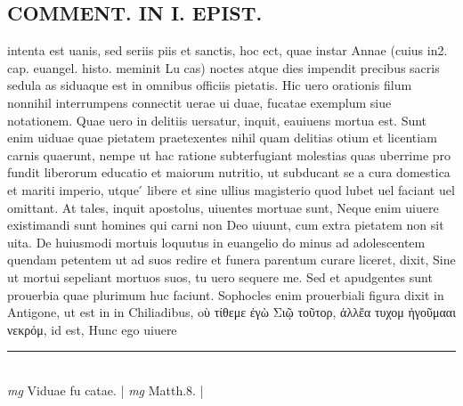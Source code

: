 \documentclass{article}
\begin{document}
\begin{pages}
\section*{COMMENT. IN I. EPIST. }\pstart intenta est uanis, sed seriis piis et sanctis, hoc ect, quae instar Annae (cuius in2. cap. euangel. histo. meminit Lu cas) noctes atque dies impendit precibus sacris sedula as siduaque est in omnibus officiis pietatis. Hic uero orationis filum nonnihil interrumpens connectit uerae ui duae, fucatae exemplum siue notationem. Quae uero in delitiis uersatur, inquit, eauiuens mortua est. Sunt enim uiduae quae pietatem praetexentes nihil quam delitias otium et licentiam carnis quaerunt, nempe ut hac ratione subterfugiant molestias quas uberrime pro fundit liberorum educatio et maiorum nutritio, ut subducant se a cura domestica et mariti imperio, utque ́ libere et sine ullius magisterio quod lubet uel faciant uel omittant. At tales, inquit apostolus, uiuentes mortuae sunt, Neque enim uiuere existimandi sunt homines qui carni non Deo uiuunt, cum extra pietatem non sit uita. De huiusmodi mortuis loquutus in euangelio do minus ad adolescentem quendam petentem ut ad suos redire et funera parentum curare liceret, dixit, Sine ut mortui sepeliant mortuos suos, tu uero sequere me. Sed et apudgentes sunt prouerbia quae plurimum huc faciunt. Sophocles enim prouerbiali figura dixit in Antigone, ut est in in Chiliadibus, oὺ τίθεμε ἐγὼ Σιῷ τοῦτορ, ἀλλἔα τυχομ ἠγοῦμααι νεκρόμ, id est, Hunc ego uiuere  \pend
\vspace{0.5cm}\noindent
\vspace{0.2cm}\rule{1cm}{0.2pt}\\ 
\hspace{0.2cm}\textit{mg}
\footnotesize Viduae fu catae. 
\normalsize| 
\hspace{0.2cm}\textit{mg}
\footnotesize Matth.8. 
\normalsize| 

\end{pages}
\end{document}
